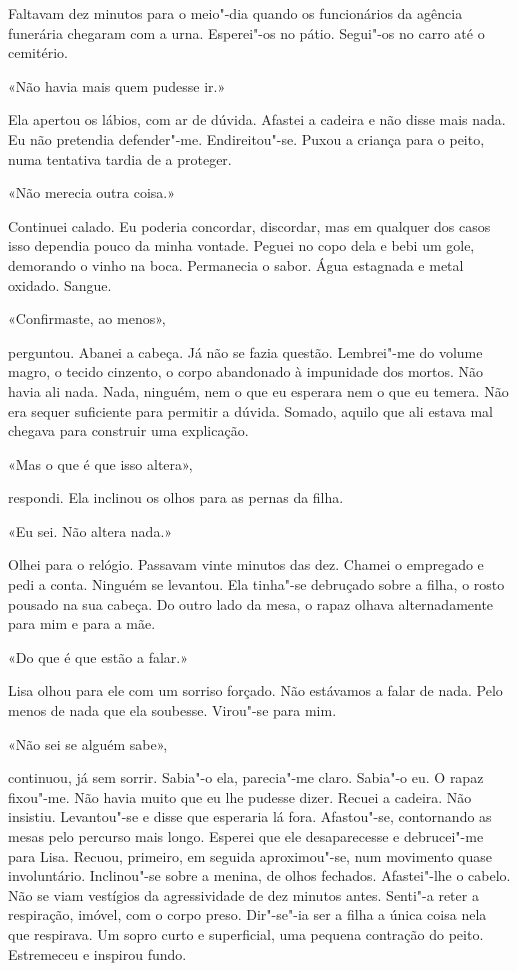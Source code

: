 Faltavam dez minutos para o meio"-dia quando os funcionários da agência
funerária chegaram com a urna. Esperei"-os no pátio. Segui"-os no carro
até o cemitério.

«Não havia mais quem pudesse ir.»

Ela apertou os lábios, com ar de dúvida. Afastei a cadeira e não disse
mais nada. Eu não pretendia defender"-me. Endireitou"-se. Puxou a
criança para o peito, numa tentativa tardia de a proteger.

«Não merecia outra coisa.»

Continuei calado. Eu poderia concordar, discordar, mas em qualquer dos
casos isso dependia pouco da minha vontade. Peguei no copo dela e bebi
um gole, demorando o vinho na boca. Permanecia o sabor. Água estagnada e
metal oxidado. Sangue.

«Confirmaste, ao menos»,

perguntou. Abanei a cabeça. Já não se fazia questão. Lembrei"-me do
volume magro, o tecido cinzento, o corpo abandonado à impunidade dos
mortos. Não havia ali nada. Nada, ninguém, nem o que eu esperara nem o
que eu temera. Não era sequer suficiente para permitir a dúvida. Somado,
aquilo que ali estava mal chegava para construir uma explicação.

«Mas o que é que isso altera»,

respondi. Ela inclinou os olhos para as pernas da filha.

«Eu sei. Não altera nada.»

Olhei para o relógio. Passavam vinte minutos das dez. Chamei o empregado
e pedi a conta. Ninguém se levantou. Ela tinha"-se debruçado sobre a
filha, o rosto pousado na sua cabeça. Do outro lado da mesa, o rapaz
olhava alternadamente para mim e para a mãe.

«Do que é que estão a falar.»

Lisa olhou para ele com um sorriso forçado. Não estávamos a falar de
nada. Pelo menos de nada que ela soubesse. Virou"-se para mim.

«Não sei se alguém sabe»,

continuou, já sem sorrir. Sabia"-o ela, parecia"-me claro. Sabia"-o eu.
O rapaz fixou"-me. Não havia muito que eu lhe pudesse dizer. Recuei a
cadeira. Não insistiu. Levantou"-se e disse que esperaria lá fora.
Afastou"-se, contornando as mesas pelo percurso mais longo. Esperei que
ele desaparecesse e debrucei"-me para Lisa. Recuou, primeiro, em seguida
aproximou"-se, num movimento quase involuntário. Inclinou"-se sobre a
menina, de olhos fechados. Afastei"-lhe o cabelo. Não se viam vestígios
da agressividade de dez minutos antes. Senti"-a reter a respiração,
imóvel, com o corpo preso. Dir"-se"-ia ser a filha a única coisa nela
que respirava. Um sopro curto e superficial, uma pequena contração do
peito. Estremeceu e inspirou fundo.

